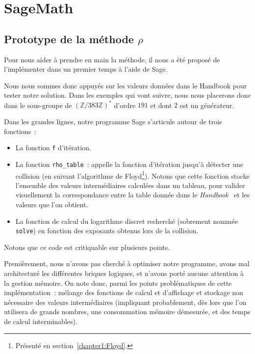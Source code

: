     \section{SageMath}
        \subsection{Prototype de la méthode \texorpdfstring{$\rho$}{Rho}}
        Pour nous aider à prendre en main la méthode, il nous a été proposé de l'implémenter dans un premier temps à l'aide de Sage.

        Nous nous sommes donc appuyés sur les valeurs données dans le Handbook pour tester notre solution.
        Dans les exemples qui vont suivre, nous nous placerons donc dans le sous-groupe de ${(\mathbb{Z}/383\mathbb{Z})}^*$ d'ordre $191$ et dont $2$ est un générateur.

        Dans les grandes lignes, notre programme Sage s'articule autour de trois fonctions~:
        \begin{itemize}
            \item La fonction \lstinline{f} d'itération.
            \item La fonction \lstinline{rho_table}~: appelle la fonction d'itération jusqu'à détecter une collision (en suivant l'algorithme de Floyd\footnote{Présenté en section~\ref{chapter1:Floyd}.}). Notons que cette fonction stocke l'ensemble des valeurs intermédiaires calculées dans un tableau, pour valider visuellement la correspondance entre la table donnée dans le \textit{Handbook}~\autocite[107]{handbook} et les valeurs que l'on obtient.
            \item La fonction de calcul du logarithme discret recherché (sobrement nommée \lstinline{solve}) en fonction des exposants obtenus lors de la collision.
        \end{itemize}

        Notons que ce code est critiquable sur plusieurs points.

        Premièrement, nous n'avons pas cherché à optimiser notre programme, avons mal architecturé les différentes briques logiques, et n'avons porté aucune attention à la gestion mémoire.
        On note donc, parmi les points problématiques de cette implémentation~: mélange des fonctions de calcul et d'affichage et stockage non nécessaire des valeurs intermédiaires (impliquant probablement, dès lors que l'on utilisera de grands nombres, une consommation mémoire démesurée, et des temps de calcul interminables).

